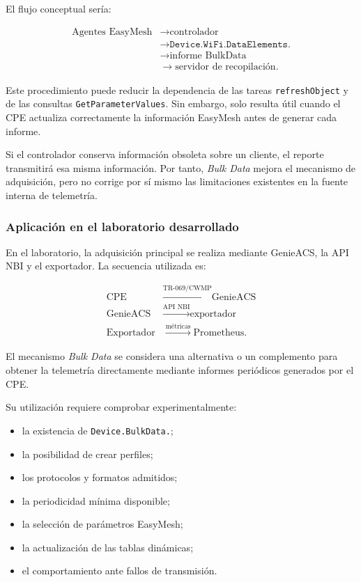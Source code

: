 El flujo conceptual sería:

\[
\begin{aligned}
    \text{Agentes EasyMesh}
    &\longrightarrow
    \text{controlador}\\
    &\longrightarrow
    \texttt{Device.WiFi.DataElements.}\\
    &\longrightarrow
    \text{informe BulkData}\\
    &\longrightarrow
    \text{servidor de recopilación}.
\end{aligned}
\]

Este procedimiento puede reducir la dependencia de las tareas
\texttt{refreshObject} y de las consultas
\texttt{GetParameterValues}. Sin embargo, solo resulta útil cuando el CPE
actualiza correctamente la información EasyMesh antes de generar cada
informe.

Si el controlador conserva información obsoleta sobre un cliente, el
reporte transmitirá esa misma información. Por tanto, \textit{Bulk Data}
mejora el mecanismo de adquisición, pero no corrige por sí mismo las
limitaciones existentes en la fuente interna de telemetría.


\subsubsection*{Aplicación en el laboratorio desarrollado}

En el laboratorio, la adquisición principal se realiza mediante
GenieACS, la API NBI y el exportador. La secuencia utilizada es:

\[
\begin{aligned}
    \text{CPE}
    &\xrightarrow{\text{TR-069/CWMP}}
    \text{GenieACS}\\
    \text{GenieACS}
    &\xrightarrow{\text{API NBI}}
    \text{exportador}\\
    \text{Exportador}
    &\xrightarrow{\text{métricas}}
    \text{Prometheus}.
\end{aligned}
\]

El mecanismo \textit{Bulk Data} se considera una alternativa o un
complemento para obtener la telemetría directamente mediante informes
periódicos generados por el CPE.

Su utilización requiere comprobar experimentalmente:

\begin{itemize}
    \item la existencia de \texttt{Device.BulkData.};
    \item la posibilidad de crear perfiles;
    \item los protocolos y formatos admitidos;
    \item la periodicidad mínima disponible;
    \item la selección de parámetros EasyMesh;
    \item la actualización de las tablas dinámicas;
    \item el comportamiento ante fallos de transmisión.
\end{itemize}

